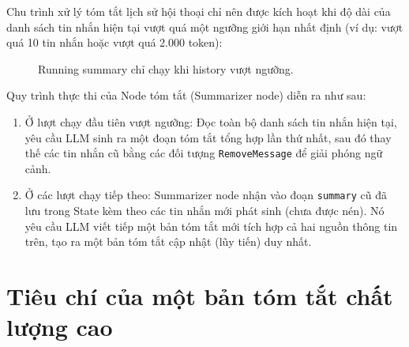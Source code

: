 Chu trình xử lý tóm tắt lịch sử hội thoại chỉ nên được kích hoạt khi độ dài của danh sách tin nhắn hiện tại vượt quá một ngưỡng giới hạn nhất định (ví dụ: vượt quá 10 tin nhắn hoặc vượt quá 2.000 token):

\begin{figure}[H]
\centering
{}
\caption{Running summary chỉ chạy khi history vượt ngưỡng.}
\label{fig:summary-loop}
\end{figure}

Quy trình thực thi của Node tóm tắt (Summarizer node) diễn ra như sau:
\begin{enumerate}
  \item Ở lượt chạy đầu tiên vượt ngưỡng: Đọc toàn bộ danh sách tin nhắn hiện tại, yêu cầu LLM sinh ra một đoạn tóm tắt tổng hợp lần thứ nhất, sau đó thay thế các tin nhắn cũ bằng các đối tượng \texttt{RemoveMessage} để giải phóng ngữ cảnh.
  \item Ở các lượt chạy tiếp theo: Summarizer node nhận vào đoạn \texttt{summary} cũ đã lưu trong State kèm theo các tin nhắn mới phát sinh (chưa được nén). Nó yêu cầu LLM viết tiếp một bản tóm tắt mới tích hợp cả hai nguồn thông tin trên, tạo ra một bản tóm tắt cập nhật (lũy tiến) duy nhất.
\end{enumerate}

\section{Tiêu chí của một bản tóm tắt chất lượng cao}

